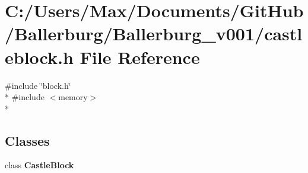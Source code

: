 \section{C\+:/\+Users/\+Max/\+Documents/\+Git\+Hub/\+Ballerburg/\+Ballerburg\+\_\+v001/castleblock.h File Reference}
\label{castleblock_8h}
{\ttfamily \#include \char`\"{}block.\+h\char`\"{}}\\*
{\ttfamily \#include $<$memory$>$}\\*
\subsection*{Classes}
\begin{DoxyCompactItemize}
\item 
class {\bf Castle\+Block}
\end{DoxyCompactItemize}
